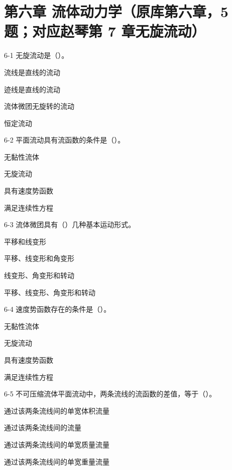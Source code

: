 \section*{第六章 流体动力学（原库第六章，5 题；对应赵琴第 7 章无旋流动）}

\begin{ti}

\item[6-1] 无旋流动是（\quad）。
\begin{choices}
\item 流线是直线的流动
\item 迹线是直线的流动
\item 流体微团无旋转的流动
\item 恒定流动
\end{choices}

\item[6-2] 平面流动具有流函数的条件是（\quad）。
\begin{choices}
\item 无黏性流体
\item 无旋流动
\item 具有速度势函数
\item 满足连续性方程
\end{choices}

\item[6-3] 流体微团具有（\quad）几种基本运动形式。
\begin{choices}
\item 平移和线变形
\item 平移、线变形和角变形
\item 线变形、角变形和转动
\item 平移、线变形、角变形和转动
\end{choices}

\item[6-4] 速度势函数存在的条件是（\quad）。
\begin{choices}
\item 无黏性流体
\item 无旋流动
\item 具有速度势函数
\item 满足连续性方程
\end{choices}

\item[6-5] 不可压缩流体平面流动中，两条流线的流函数的差值，等于（\quad）。
\begin{choices}
\item 通过该两条流线间的单宽体积流量
\item 通过该两条流线间的流量
\item 通过该两条流线间的单宽质量流量
\item 通过该两条流线间的单宽重量流量
\end{choices}

\end{ti}
